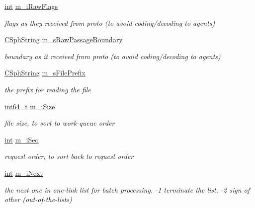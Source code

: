 \begin{DoxyCompactItemize}
\hyperlink{sphinxexpr_8cpp_a4a26e8f9cb8b736e0c4cbf4d16de985e}{int} \hyperlink{structExcerptQuery__t_a1b0e81cfad30a20be575602170481d3b}{m\-\_\-i\-Raw\-Flags}
\begin{DoxyCompactList}\small\item\em flags as they received from proto (to avoid coding/decoding to agents) \end{DoxyCompactList}\item 
\hyperlink{structCSphString}{C\-Sph\-String} \hyperlink{structExcerptQuery__t_a3ad07609a22cdb1c120716d497de024d}{m\-\_\-s\-Raw\-Passage\-Boundary}
\begin{DoxyCompactList}\small\item\em boundary as it received from proto (to avoid coding/decoding to agents) \end{DoxyCompactList}\item 
\hyperlink{structCSphString}{C\-Sph\-String} \hyperlink{structExcerptQuery__t_ab174f0187bb3b6cc6e0ca0d93802ac28}{m\-\_\-s\-File\-Prefix}
\begin{DoxyCompactList}\small\item\em the prefix for reading the file \end{DoxyCompactList}\item 
\hyperlink{sphinxstd_8h_a996e72f71b11a5bb8b3b7b6936b1516d}{int64\-\_\-t} \hyperlink{structExcerptQuery__t_a0a99a80172a4c1191289e0327c2605eb}{m\-\_\-i\-Size}
\begin{DoxyCompactList}\small\item\em file size, to sort to work-\/queue order \end{DoxyCompactList}\item 
\hyperlink{sphinxexpr_8cpp_a4a26e8f9cb8b736e0c4cbf4d16de985e}{int} \hyperlink{structExcerptQuery__t_abff6d76f96153a0c67a1d3ef21975787}{m\-\_\-i\-Seq}
\begin{DoxyCompactList}\small\item\em request order, to sort back to request order \end{DoxyCompactList}\item 
\hyperlink{sphinxexpr_8cpp_a4a26e8f9cb8b736e0c4cbf4d16de985e}{int} \hyperlink{structExcerptQuery__t_af9d1c73cdff1f0164ec60aca96b66e33}{m\-\_\-i\-Next}
\begin{DoxyCompactList}\small\item\em the next one in one-\/link list for batch processing. -\/1 terminate the list. -\/2 sign of other (out-\/of-\/the-\/lists) \end{DoxyCompactList}\item 

\end{DoxyCompactItemize}

